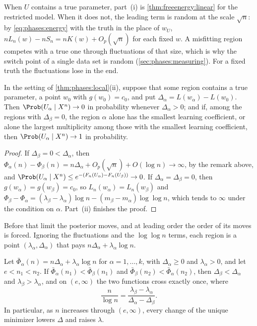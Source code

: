 \begin{refsection}
When $U$ contains a true parameter, part~(i) is \cref{thm:freeenergy:linear} for the restricted model. When it does not, the leading term is random at the scale $\sqrt n$: by \eqref{eq:phases:energy} with the truth in the place of $w_U$, $nL_n(w)-nS_n=nK(w)+O_p(\sqrt n)$ for each fixed $w$. A misfitting region competes with a true one through fluctuations of that size, which is why the switch point of a single data set is random (\cref{sec:phases:measuring}). For a fixed truth the fluctuations lose in the end.

\begin{corollary}\label{cor:phases:limit}
In the setting of \cref{thm:phases:local}(ii), suppose that some region contains a true parameter, a point $w_0$ with $g(w_0)=c_0$, and put $\Delta_\alpha=L(w_\alpha)-L(w_0)$. Then $\Prob(U_\alpha\mid X^n)\to0$ in probability whenever $\Delta_\alpha>0$; and if, among the regions with $\Delta_\beta=0$, the region $\alpha$ alone has the smallest learning coefficient, or alone the largest multiplicity among those with the smallest learning coefficient, then $\Prob(U_\alpha\mid X^n)\to1$ in probability.
\end{corollary}

\begin{proof}
If $\Delta_\beta=0<\Delta_\alpha$, then $\Phi_\alpha(n)-\Phi_\beta(n)=n\Delta_\alpha+O_p(\sqrt n)+O(\log n)\to\infty$, by the remark above, and $\Prob(U_\alpha\mid X^n)\le e^{-(F_n(U_\alpha)-F_n(U_\beta))}\to0$. If $\Delta_\alpha=\Delta_\beta=0$, then $g(w_\alpha)=g(w_\beta)=c_0$, so $L_n(w_\alpha)=L_n(w_\beta)$ and $\Phi_\beta-\Phi_\alpha=(\lambda_\beta-\lambda_\alpha)\log n-(m_\beta-m_\alpha)\log\log n$, which tends to $\infty$ under the condition on $\alpha$. Part~(ii) finishes the proof.
\end{proof}

Before that limit the posterior moves, and at leading order the order of its moves is forced. Ignoring the fluctuations and the $\log\log n$ terms, each region is a point $(\lambda_\alpha,\Delta_\alpha)$ that pays $n\Delta_\alpha+\lambda_\alpha\log n$.

\begin{proposition}\label{prop:phases:order}
Let $\bar\Phi_\alpha(n)=n\Delta_\alpha+\lambda_\alpha\log n$ for $\alpha=1,\dots,k$, with $\Delta_\alpha\ge0$ and $\lambda_\alpha>0$, and let $e<n_1<n_2$. If $\bar\Phi_\alpha(n_1)<\bar\Phi_\beta(n_1)$ and $\bar\Phi_\beta(n_2)<\bar\Phi_\alpha(n_2)$, then $\Delta_\beta<\Delta_\alpha$ and $\lambda_\beta>\lambda_\alpha$, and on $(e,\infty)$ the two functions cross exactly once, where
\[
\frac n{\log n}=\frac{\lambda_\beta-\lambda_\alpha}{\Delta_\alpha-\Delta_\beta}.
\]
In particular, as $n$ increases through $(e,\infty)$, every change of the unique minimizer lowers $\Delta$ and raises $\lambda$.
\end{proposition}


\end{refsection}
